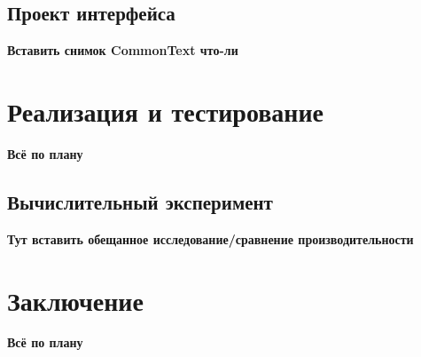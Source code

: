 \documentclass{fefu}
\begin{document}
		\subsection{Проект интерфейса}
			\textbf{Вставить снимок CommonText что-ли}
	\section{Реализация и тестирование}
		\textbf{Всё по плану}
		\subsection{Вычислительный эксперимент}
			\textbf{Тут вставить обещанное исследование/сравнение производительности}
	\section*{Заключение}
		\textbf{Всё по плану}
	\newpage
	
	
	
\end{document}
